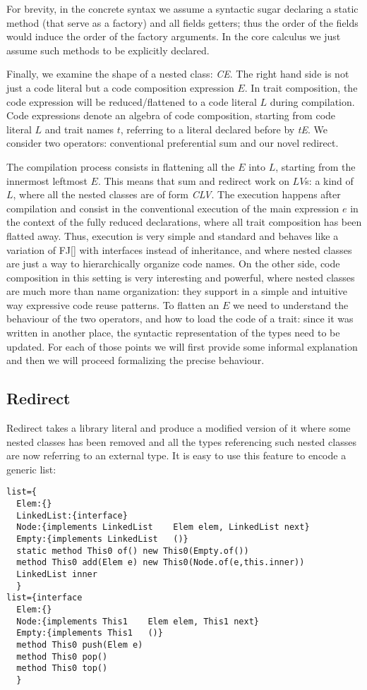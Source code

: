 For brevity, in the concrete syntax we assume a syntactic sugar declaring
a static \Q@of@ method (that serve as a factory) and all fields getters; 
thus the order of the fields would induce the order of the factory arguments.
In the core calculus we just assume such methods to be explicitly declared.

Finally, we examine the shape of a nested class: \textit{C\eq{}E}.
The right hand side is not just a code literal but a code composition expression $E$.
In trait composition, the code expression will be reduced/flattened to a code literal $L$
during compilation.
Code expressions denote an algebra of code composition, starting from code literal $L$
and trait names $t$, referring to a literal declared before by \textit{t\eq{}E}.
We consider two operators: conventional preferential sum 
 \textit{} and our novel redirect\textit{}.

The compilation process consists in flattening all the $E$ into $L$,
starting from the innermost leftmost $E$. This means that sum and redirect work on $LV$s:
a kind of $L$, where all the nested classes are of form \textit{C\eq{}LV}.
The execution happens after compilation and consist in the conventional execution of the main expression $e$
in the context of the fully reduced declarations, where all trait composition has
been flatted away.
Thus, execution is very simple and standard and behaves like a variation of FJ[] with interfaces
instead of inheritance, and where nested classes are just a way to hierarchically organize code names.
On the other side, code composition in this setting is very interesting and powerful, where
nested classes are much more than name organization: they support in a simple and intuitive way
expressive code reuse patterns.
To flatten an $E$ we need to understand the behaviour of the two operators, and how to 
load the code of a trait: since it was written in another place, the syntactic representation of
the types need to be updated.
For each of those points we will first provide some informal explanation and then we will proceed formalizing
the precise behaviour.

\subsection{Redirect}

Redirect %
takes a library literal and produce a modified version of it where some nested classes has been removed
and all the types referencing such nested classes are now referring to an external type. It is easy to use this feature to encode a generic list:
\begin{lstlisting}
list={
  Elem:{}
  LinkedList:{interface}
  Node:{implements LinkedList    Elem elem, LinkedList next}
  Empty:{implements LinkedList   ()}
  static method This0 of() new This0(Empty.of())
  method This0 add(Elem e) new This0(Node.of(e,this.inner))
  LinkedList inner
  }
list={interface
  Elem:{}
  Node:{implements This1    Elem elem, This1 next}
  Empty:{implements This1   ()}
  method This0 push(Elem e)
  method This0 pop()
  method This0 top()
  }
\end{lstlisting}


